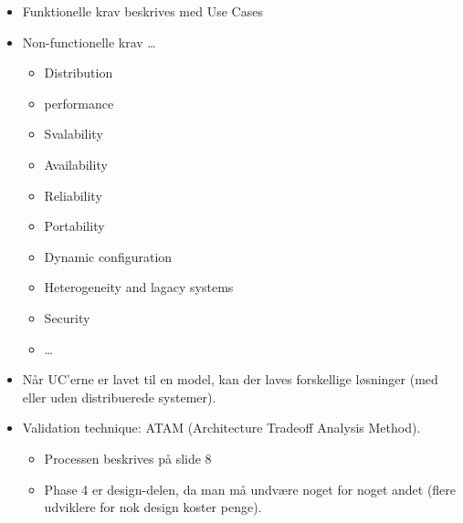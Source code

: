 \documentclass[10pt, a4]{Memoir}
\begin{document}
\begin{itemize}
	\item Funktionelle krav beskrives med Use Cases
	\item Non-functionelle krav \dots
	\begin{itemize}
		\item Distribution
		\item performance
		\item Svalability
		\item Availability
		\item Reliability
		\item Portability
		\item Dynamic configuration
		\item Heterogeneity and lagacy systems
		\item Security
		\item \dots
	\end{itemize}
	\item Når UC'erne er lavet til en model, kan der laves forskellige løsninger (med eller uden distribuerede systemer).
	\item Validation technique: ATAM (Architecture Tradeoff Analysis Method).
	\begin{itemize}
		\item Processen beskrives på slide 8
		\item Phase 4 er design-delen, da man må undvære noget for noget andet (flere udviklere for nok design koster penge).
	\end{itemize}
\end{itemize}
\end{document}
